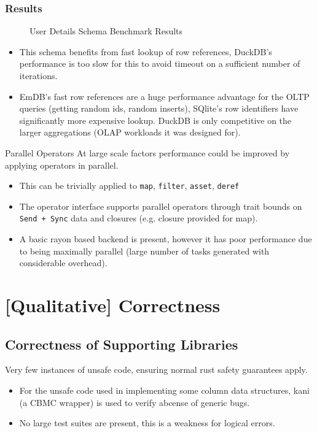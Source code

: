 \subsubsection{Results}
\begin{figure}[h!]
    \centering
    \vspace{-0.4em}
    \resizebox{\textwidth}{!}{}
    \resizebox{\textwidth}{!}{}
    \caption{User Details Schema Benchmark Results}
    \label{fig:user_details_benchmark_results}
\end{figure}
\begin{itemize}
    \setlength\itemsep{0em}
    \item This schema benefits from fast lookup of row references, DuckDB's performance is too slow for this to avoid timeout on a sufficient number of iterations.
    \item EmDB's fast row references are a huge performance advantage for the OLTP queries (getting random ids, random inserts), SQlite's row identifiers have significantly more expensive lookup. DuckDB is only competitive on the larger aggregations (OLAP workloads it was designed for).
\end{itemize}
\begin{futurebox}{Parallel Operators}
    At large scale factors performance could be improved by applying operators in parallel.
    \begin{itemize}
        \setlength\itemsep{0em}
        \item This can be trivially applied to \texttt{map}, \texttt{filter}, \texttt{asset}, \texttt{deref}
        \item The operator interface supports parallel operators through trait bounds on \texttt{Send + Sync} data and closures (e.g. closure provided for map).
        \item A basic rayon\cite{RayonExplainer} based backend is present, however it has poor performance due to being maximally parallel (large number of tasks generated with considerable overhead).
    \end{itemize}
\end{futurebox}

\section{[Qualitative] Correctness}
\subsection{Correctness of Supporting Libraries}
Very few instances of unsafe code, ensuring normal rust safety guarantees apply.
\begin{itemize}
    \setlength\itemsep{0em}
    \item For the unsafe code used in implementing some column data structures, kani\cite{KaniGithub} (a CBMC\cite{DiffBlueCBMC} wrapper) is used to verify abcense of generic bugs.
    \item No large test suites are present, this is a weakness for logical errors.
\end{itemize}

